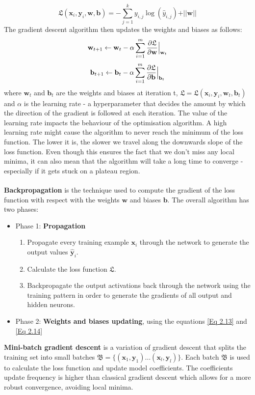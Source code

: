 \begin{equation}
\mathfrak{L}(\mathbf{x}_i, \mathbf{y}_i, \mathbf{w}, \mathbf{b}) = -\sum_{j=1}^{k}y_{i,j}\log(\hat{y}_{i,j}) + \vert\vert \mathbf{w} \vert\vert
\end{equation} 
The gradient descent algorithm then updates the weights and biases as follows: 
\begin{equation}
\centering
\mathbf{w}_{t+1} \leftarrow \mathbf{w}_t - \alpha \sum_{i=1}^{m}\frac{\partial \mathfrak{L}}{\partial \mathbf{w}}\Bigr|_{\substack{\mathbf{w}_t}}
\label{Eq: gdes/update/weights}
\end{equation}
\begin{equation}
\centering
\mathbf{b}_{t+1} \leftarrow \mathbf{b}_t - \alpha \sum_{i=1}^{m}\frac{\partial \mathfrak{L}}{\partial \mathbf{b}}\Bigr|_{\substack{\mathbf{b}_t}}
\label{Eq: gdes/update/weigts}
\end{equation}
where $\mathbf{w}_t$ and $\mathbf{b}_t$ are the weights and biases at iteration t, $\mathfrak{L} = \mathfrak{L}(\mathbf{x}_i, \mathbf{y}_i, \mathbf{w}_t, \mathbf{b}_t)$ and $\alpha$ is the learning rate - a hyperparameter that decides the amount by which the direction of the gradient is followed at each iteration. The value of the learning rate impacts the behaviour of the optimisation algorithm. A high learning rate might cause the algorithm to never reach the minimum of the loss function. The lower it is, the slower we travel along the downwards slope of the loss function. Even though this ensures the fact that we don't miss any local minima, it can also mean that the algorithm will take a long time to converge - especially if it gets stuck on a plateau region. 
\\ \\
\textbf{Backpropagation} is the technique used to compute the gradient of the loss function with respect with the weights $\mathbf{w}$ and biases $\mathbf{b}$. The overall algorithm has two phases:
\begin{itemize}
	\item Phase 1: \textbf{Propagation}
	\begin{enumerate}
		\item Propagate every training example $\mathbf{x}_i$ through the network to generate the output values $\mathbf{\hat{y}}_i$.
		\item Calculate the loss function $\mathfrak{L}$.
		\item Backpropagate the output activations back through the network using the training pattern in order to generate the gradients of all output and hidden neurons.
	\end{enumerate}
	\item Phase 2: \textbf{Weights and biases updating}, using the equations \ref{Eq 2.13} and \ref{Eq 2.14}
\end{itemize}
\textbf{Mini-batch gradient descent} is a variation of gradient descent that splits the training set into small batches $\mathfrak{B}=\{(\mathbf{x}_1, \mathbf{y}_1)\dots(\mathbf{x}_l, \mathbf{y}_l)\}$. Each batch $\mathfrak{B}$ is used to calculate the loss function and update model coefficients. The coefficients update frequency is higher than classical gradient descent which allows for a more robust convergence, avoiding local minima. 

